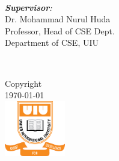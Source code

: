 \documentclass[12pt]{book} %
\begin{document}
\begin{titlepage}
\begin{minipage}{0.5\textwidth}
\begin{flushleft}
\end{flushleft}
\end{minipage}
~
\begin{minipage}{0.4\textwidth}
\begin{flushright} \large
\emph{\textbf{Supervisor}:} \\
Dr. Mohammad Nurul Huda  \\%
Professor, Head of CSE Dept. \\
Department of CSE, UIU\\

\end{flushright}
\end{minipage}\\[3cm]



\ifx
\textregistered\textcopyright
\sffamily\textregistered\textcopyright
\fi

Copyright\\
\today\\[1cm]

\includegraphics[width=100px]{assets/uiu-logo.png}\\[1cm] %
 

\vfill %

\end{titlepage}
\end{document}
